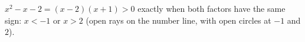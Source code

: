 $x^2-x-2=(x-2)(x+1)>0$ exactly when both factors have the same sign: $\boxed{x<-1\text{ or }x>2}$ (open rays on the number line, with open circles at $-1$ and $2$).
